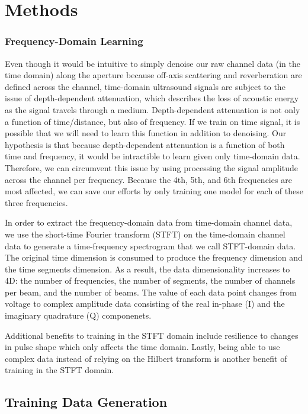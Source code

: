 \chapter{Methods}

\subsection{Frequency-Domain Learning}

Even though it would be intuitive to simply denoise our raw channel data (in the time domain) along the aperture because off-axis scattering and reverberation are defined across the channel, time-domain ultrasound signals are subject to the issue of depth-dependent attenuation, which describes the loss of acoustic energy as the signal travels through a medium. Depth-dependent attenuation is not only a function of time/distance, but also of frequency. If we train on time signal, it is possible that we will need to learn this function in addition to denoising. Our hypothesis is that because depth-dependent attenuation is a function of both time and frequency, it would be intractible to learn given only time-domain data. Therefore, we can circumvent this issue by using processing the signal amplitude across the channel per frequency. Because the 4th, 5th, and 6th frequencies are most affected, we can save our efforts by only training one model for each of these three frequencies.

In order to extract the frequency-domain data from time-domain channel data, we use the short-time Fourier transform (STFT) on the time-domain channel data to generate a time-frequency spectrogram that we call STFT-domain data. The original time dimension is consumed to produce the frequency dimension and the time segments dimension. As a result, the data dimensionality increases to 4D: the number of frequencies, the number of segments, the number of channels per beam, and the number of beams. The value of each data point changes from voltage to complex amplitude data consisting of the real in-phase (I) and the imaginary quadrature (Q) componenets.

Additional benefits to training in the STFT domain include resilience to changes in pulse shape which only affects the time domain. Lastly, being able to use complex data instead of relying on the Hilbert transform is another benefit of training in the STFT domain.

\section{Training Data Generation}

